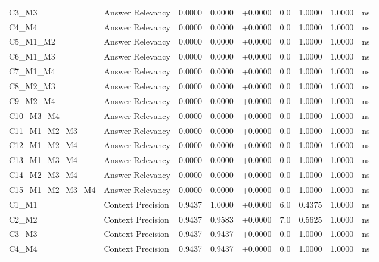 \begin{table}[p]
\begin{tabular*}{\textwidth}{@{\extracolsep{\fill}} l l r r r r r r c @{}}
\addlinespace
C3\_M3          & Answer Relevancy     & 0.0000 & 0.0000 & +0.0000 & 0.0 & 1.0000 & 1.0000 & ns \\
\addlinespace
C4\_M4          & Answer Relevancy     & 0.0000 & 0.0000 & +0.0000 & 0.0 & 1.0000 & 1.0000 & ns \\
\addlinespace
C5\_M1\_M2      & Answer Relevancy     & 0.0000 & 0.0000 & +0.0000 & 0.0 & 1.0000 & 1.0000 & ns \\
\addlinespace
C6\_M1\_M3      & Answer Relevancy     & 0.0000 & 0.0000 & +0.0000 & 0.0 & 1.0000 & 1.0000 & ns \\
\addlinespace
C7\_M1\_M4      & Answer Relevancy     & 0.0000 & 0.0000 & +0.0000 & 0.0 & 1.0000 & 1.0000 & ns \\
\addlinespace
C8\_M2\_M3      & Answer Relevancy     & 0.0000 & 0.0000 & +0.0000 & 0.0 & 1.0000 & 1.0000 & ns \\
\addlinespace
C9\_M2\_M4      & Answer Relevancy     & 0.0000 & 0.0000 & +0.0000 & 0.0 & 1.0000 & 1.0000 & ns \\
\addlinespace
C10\_M3\_M4     & Answer Relevancy     & 0.0000 & 0.0000 & +0.0000 & 0.0 & 1.0000 & 1.0000 & ns \\
\addlinespace
C11\_M1\_M2\_M3 & Answer Relevancy     & 0.0000 & 0.0000 & +0.0000 & 0.0 & 1.0000 & 1.0000 & ns \\
\addlinespace
C12\_M1\_M2\_M4 & Answer Relevancy     & 0.0000 & 0.0000 & +0.0000 & 0.0 & 1.0000 & 1.0000 & ns \\
\addlinespace
C13\_M1\_M3\_M4 & Answer Relevancy     & 0.0000 & 0.0000 & +0.0000 & 0.0 & 1.0000 & 1.0000 & ns \\
\addlinespace
C14\_M2\_M3\_M4 & Answer Relevancy     & 0.0000 & 0.0000 & +0.0000 & 0.0 & 1.0000 & 1.0000 & ns \\
\addlinespace
C15\_M1\_M2\_M3\_M4 & Answer Relevancy     & 0.0000 & 0.0000 & +0.0000 & 0.0 & 1.0000 & 1.0000 & ns \\
\addlinespace
C1\_M1          & Context Precision    & 0.9437 & 1.0000 & +0.0000 & 6.0 & 0.4375 & 1.0000 & ns \\
\addlinespace
C2\_M2          & Context Precision    & 0.9437 & 0.9583 & +0.0000 & 7.0 & 0.5625 & 1.0000 & ns \\
\addlinespace
C3\_M3          & Context Precision    & 0.9437 & 0.9437 & +0.0000 & 0.0 & 1.0000 & 1.0000 & ns \\
\addlinespace
C4\_M4          & Context Precision    & 0.9437 & 0.9437 & +0.0000 & 0.0 & 1.0000 & 1.0000 & ns \\

\end{tabular*}
\end{table}
